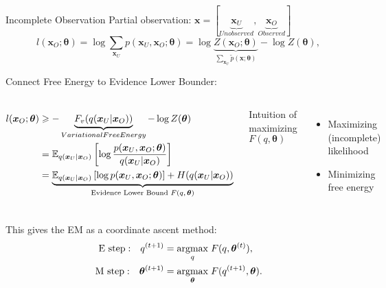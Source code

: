 \begin{frame}[label=current]
  {Incomplete Observation}
  Partial observation: $\bm{x} = [  \underbrace{\bm{x}_U}_{Unobserved}, \underbrace{\bm{x}_O}_{Observed}]$
  \begin{equation*}
    l(\bm{x}_O; \bm{\theta}) = \log{\sum_{\bm{x}_U}p(\bm{x}_U, \bm{x}_O; \bm{\theta})} = \log{\underbrace{Z(\bm{x}_O;\bm{\theta})}_{\sum_{\bm{x}_U}\tilde{p}(\bm{x}; \bm{\theta})}} - \log{Z(\bm{\theta})},
  \end{equation*}

  {Connect Free Energy to Evidence Lower Bounder}:
  \begin{columns}
    \begin{align*}
      l(\bm{x}_O; \bm{\theta}) &\geqslant - \underbrace{F_v(q(\bm{x}_U|\bm{x}_O))}_{Variational Free Energy} - \log{Z(\bm{\theta})} \nonumber \\
                               & = \mathbb{E}_{q(\bm{x}_U|\bm{x}_O)}\left[ \log{\frac{{p}(\bm{x}_U, \bm{x}_O; \bm{\theta})}{q(\bm{x}_U|\bm{x}_O)}} \right] \nonumber \\
                               & = \underbrace{\mathbb{E}_{q(\bm{x}_U|\bm{x}_O)}\left[ \log{{p}(\bm{x}_U, \bm{x}_O; \bm{\theta})} \right] + H({q(\bm{x}_U|\bm{x}_O)})}_{\text{Evidence Lower Bound $F(q, \bm{\theta})$}}
    \end{align*}
    
    Intuition of maximizing $F(q,\bm{\theta})$
    \begin{itemize}[label=\textbullet]
    \item Maximizing (incomplete) likelihood
    \item Minimizing free energy
    \end{itemize}

  \end{columns}
  This gives the EM as a coordinate ascent method:
  \begin{align*}
    \mathrm{E~step:}~~~ q^{(t+1)} &= \underset{q}{\operatorname{argmax}}\;{F(q, \bm{\theta}^{(t)})}, \\
    \mathrm{M~step:}~~~\bm{\theta}^{(t+1)} &= \underset{\bm{\theta}}{\operatorname{argmax}}\;{F(q^{(t+1)}, \bm{\theta})}.
  \end{align*}
\end{frame}



